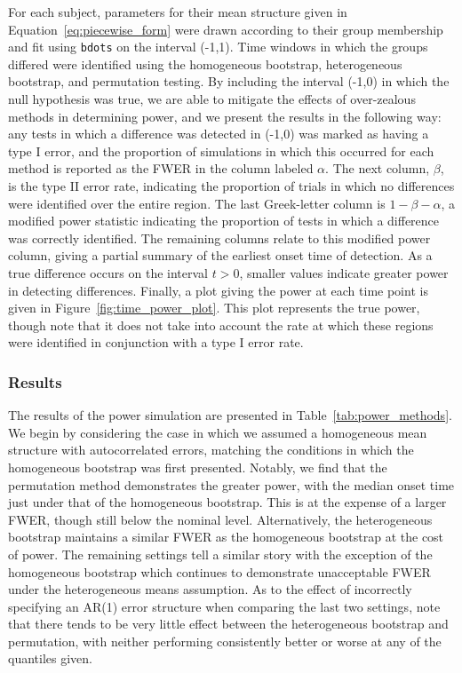 \documentclass{article}
\newcommand{\xt}{\texttt}
\begin{document}
For each subject, parameters for their mean structure given in Equation~\ref{eq:piecewise_form} were drawn according to their group membership and fit using \xt{bdots} on the interval (-1,1). Time windows in which the groups differed were identified using the homogeneous bootstrap, heterogeneous bootstrap, and permutation testing. By including the interval (-1,0) in which the null hypothesis was true, we are able to mitigate the effects of over-zealous methods in determining power, and we present the results in the following way: any tests in which a difference was detected in (-1,0) was marked as having a type I error, and the proportion of simulations in which this occurred for each method is reported as the FWER in the column labeled $\alpha$. The next column, $\beta$, is the type II error rate, indicating the proportion of trials in which no differences were identified over the entire region. The last Greek-letter column is $1 - \beta - \alpha$, a modified power statistic indicating the proportion of tests in which a difference was correctly identified. The remaining columns relate to this modified power column, giving a partial summary of the earliest onset time of detection. As a true difference occurs on the interval $t > 0$, smaller values indicate greater power in detecting differences. Finally, a plot giving the power at each time point is given in Figure~\ref{fig:time_power_plot}. This plot represents the true power, though note that it does not take into account the rate at which these regions were identified in conjunction with a type I error rate. 


\subsubsection{Results}


The results of the power simulation are presented in Table~\ref{tab:power_methods}. We begin by considering the case in which we assumed a homogeneous mean structure with autocorrelated errors, matching the conditions in which the homogeneous bootstrap was first presented. Notably, we find that the permutation method demonstrates the greater power, with the median onset time just under that of the homogeneous bootstrap. This is at the expense of a larger FWER, though still below the nominal level. Alternatively, the heterogeneous bootstrap maintains a similar FWER as the homogeneous bootstrap at the cost of power. The remaining settings tell a similar story with the exception of the homogeneous bootstrap which continues to demonstrate unacceptable FWER under the heterogeneous means assumption. As to the effect of incorrectly specifying an AR(1) error structure when comparing the last two settings, note that there tends to be very little effect between the heterogeneous bootstrap and permutation, with neither performing consistently better or worse at any of the quantiles given.
\end{document}
